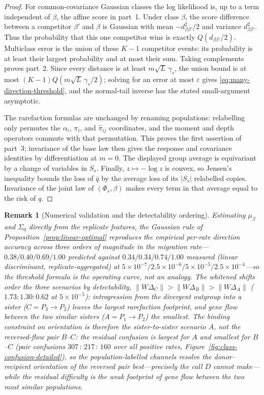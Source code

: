 \documentclass[11pt]{article}
\theoremstyle{plain}
\newtheorem{rem}[thm]{Remark}
\theoremstyle{definition}
\theoremstyle{remark}
\begin{document}
\begin{proof}
For common-covariance Gaussian classes the log likelihood is, up to a term independent of
$\beta$, the affine score in part~1. Under class $\beta$, the score difference between a
competitor $\beta'$ and $\beta$ is Gaussian with mean $-d_{\beta\beta'}^2/2$ and variance
$d_{\beta\beta'}^2$. Thus the probability that this one competitor wins is exactly
$Q(d_{\beta\beta'}/2)$. Multiclass error is the union of these $K-1$ competitor events: its
probability is at least their largest probability and at most their sum. Taking complements
proves part~2. Since every distance is at least $m\sqrt L\,\gamma_s$, the union bound is at most
$(K-1)Q(m\sqrt L\,\gamma_s/2)$; solving for an error at most $\varepsilon$ gives
\eqref{eq:many-direction-threshold}, and the
normal-tail inverse has the stated small-argument asymptotic.

The rarefaction formulas are unchanged by renaming populations: relabelling only permutes the
$\alpha_i$, $\pi_i$, and $\widehat\pi_{ij}$ coordinates, and the moment and depth operators commute
with that permutation. This proves the first assertion of part~3; invariance of the base law then
gives the response and covariance identities by differentiation at $m=0$. The displayed group
average is equivariant by a change of variables in $S_s$. Finally, $z\mapsto-\log z$ is convex,
so Jensen's inequality bounds the loss of $\overline q$ by the average loss of its $|S_s|$
relabelled copies. Invariance of the joint law of $(\Phi_s,\beta)$ makes every term in that average
equal to the risk of $q$.
\end{proof}

\begin{rem}[Numerical validation and the detectability ordering]\label{rem:threshold-numerics}
Estimating $\mu_\beta$ and $\Sigma_0$ directly from the replicate features, the Gaussian rule of
Proposition~\ref{prop:linear-optimal} reproduces the empirical per-rate direction accuracy across
three orders of magnitude in the migration rate---$0.38/0.40/0.69/1.00$ predicted against
$0.34/0.34/0.74/1.00$ measured (linear discriminant, replicate-aggregated) at
$5\times10^{-7}/2.5\times10^{-6}/5\times10^{-5}/2.5\times10^{-4}$---so the threshold formula is the
operating curve, not an analogy. The whitened shifts order the three scenarios by detectability,
$\lVert W\Delta_C\rVert>\lVert W\Delta_B\rVert>\lVert W\Delta_A\rVert$
($1.73:1.30:0.62$ at $5\times10^{-5}$): introgression from the divergent outgroup into a sister
($C=P_3\!\to\!P_2$) leaves the largest rarefaction footprint, and gene flow between the two similar
sisters ($A=P_1\!\to\!P_2$) the smallest. The binding constraint on orientation is therefore the
sister-to-sister scenario $A$, not the reversed-flow pair $B$--$C$: the residual confusion is largest
for $A$ and smallest for $B$--$C$ (pair confusions $307\,{:}\,217\,{:}\,160$ over all positive rates,
Figure~\ref{fig:class-confusion-detailed}), so the population-labelled channels resolve the
donor--recipient orientation of the reversed pair \emph{best}---precisely the call $D$ cannot
make---while the residual difficulty is the weak footprint of gene flow between the two most similar
populations.
\end{rem}
\end{document}
